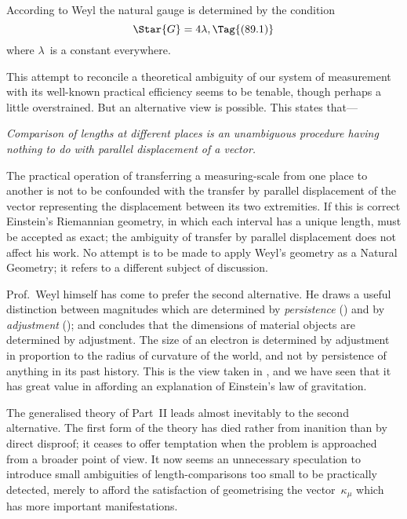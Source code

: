 \documentclass[12pt]{book}
\begin{document}
According to Weyl the natural gauge is determined by the condition
\[
\Star{G} = 4\lambda,
\Tag{(89.1)}
\]
where $\lambda$~is a constant everywhere.

This attempt to reconcile a theoretical ambiguity of our system of
measurement with its well-known practical efficiency seems to be tenable,
though perhaps a little overstrained. But an alternative view is possible.
This states that---

\emph{Comparison of lengths at different places is an unambiguous procedure
having nothing to do with parallel displacement of a vector.}

The practical operation of transferring a measuring\hyp{}scale from one place
to another is not to be confounded with the transfer by parallel displacement
of the vector representing the displacement between its two extremities. If
this is correct Einstein's Riemannian geometry, in which each interval has
a unique length, must be accepted as exact; the ambiguity of transfer by
parallel displacement does not affect his work. No attempt is to be made to
apply Weyl's geometry as a Natural Geometry; it refers to a different
subject of discussion.

Prof.\ Weyl himself has come to prefer the second alternative. He draws a
%
%
useful distinction between magnitudes which are determined by \emph{persistence}
() and by \emph{adjustment} (); and concludes that the dimensions
of material objects are determined by adjustment. The size of an
electron is determined by adjustment in proportion to the radius of curvature
of the world, and not by persistence of anything in its past history. This is
the view taken in , and we have seen that it has great value in affording
an explanation of Einstein's law of gravitation.

The generalised theory of Part~II leads almost inevitably to the second
alternative. The first form of the theory has died rather from inanition
than by direct disproof; it ceases to offer temptation when the problem is
approached from a broader point of view. It now seems an unnecessary
speculation to introduce small ambiguities of length\hyp{}comparisons too small
to be practically detected, merely to afford the satisfaction of geometrising
the vector~$\kappa_{\mu}$ which has more important manifestations.
\end{document}
